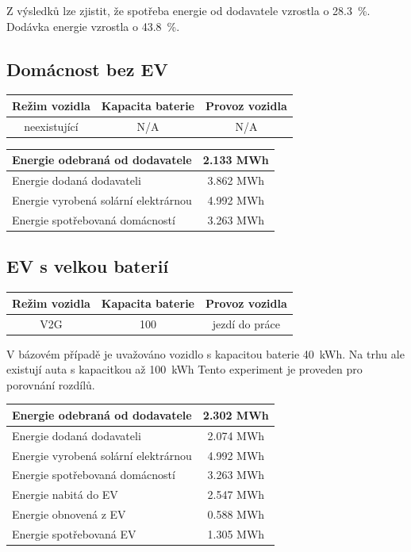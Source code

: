 \documentclass[12pt,a4paper]{Cotmas-2018}
\begin{document}
Z výsledků lze zjistit, že spotřeba energie od dodavatele vzrostla o 28.3~\%. Dodávka energie vzrostla o 43.8~\%.

\subsection{Domácnost bez EV}

\bigskip
\begin{tabular}{ | c | c | c | }
\hline
Režim vozidla & Kapacita baterie & Provoz vozidla \\
\hline
neexistující & N/A & N/A \\
\hline
\end{tabular}
\bigskip

\bigskip
\begin{tabular}{ | l | c | }
\hline
Energie odebraná od dodavatele & 2.133 MWh \\
\hline
Energie dodaná dodavateli &  3.862 MWh \\
\hline
Energie vyrobená solární elektrárnou & 4.992 MWh \\
\hline
Energie spotřebovaná domácností & 3.263 MWh \\
\hline
\end{tabular}
\bigskip


\subsection{EV s velkou baterií}

\bigskip
\begin{tabular}{ | c | c | c | }
\hline
Režim vozidla & Kapacita baterie & Provoz vozidla \\
\hline
V2G & 100 & jezdí do práce \\
\hline
\end{tabular}
\bigskip

V bázovém případě je uvažováno vozidlo s kapacitou baterie 40~kWh.
Na trhu ale existují auta s kapacitkou až 100~kWh
Tento experiment je proveden pro porovnání rozdílů.

\bigskip
\begin{tabular}{ | l | c | }
\hline
Energie odebraná od dodavatele & 2.302 MWh \\
\hline
Energie dodaná dodavateli & 2.074 MWh \\
\hline
Energie vyrobená solární elektrárnou & 4.992 MWh \\
\hline
Energie spotřebovaná domácností & 3.263 MWh \\
\hline
Energie nabitá do EV & 2.547 MWh \\
\hline
Energie obnovená z EV & 0.588 MWh \\
\hline
Energie spotřebovaná EV & 1.305 MWh \\
\hline
\end{tabular}
\bigskip
\end{document}
